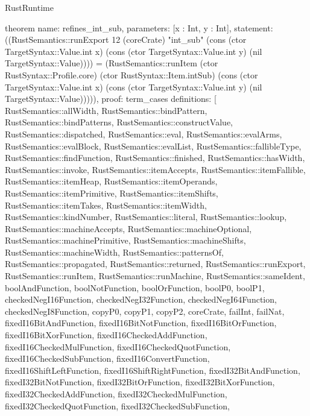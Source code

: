 \begin{lexlean}{RustRuntime}
\begin{semanticmodule}
theorem{
  name: refines_int_sub,
  parameters: [x : Int, y : Int],
  statement: ((RustSemantics::runExport 12 (coreCrate) "int_sub" (cons (ctor TargetSyntax::Value.int x) (cons (ctor TargetSyntax::Value.int y) (nil TargetSyntax::Value)))) = (RustSemantics::runItem (ctor RustSyntax::Profile.core) (ctor RustSyntax::Item.intSub) (cons (ctor TargetSyntax::Value.int x) (cons (ctor TargetSyntax::Value.int y) (nil TargetSyntax::Value))))),
  proof: term_cases{
    definitions: [
      RustSemantics::allWidth,
      RustSemantics::bindPattern,
      RustSemantics::bindPatterns,
      RustSemantics::constructValue,
      RustSemantics::dispatched,
      RustSemantics::eval,
      RustSemantics::evalArms,
      RustSemantics::evalBlock,
      RustSemantics::evalList,
      RustSemantics::fallibleType,
      RustSemantics::findFunction,
      RustSemantics::finished,
      RustSemantics::hasWidth,
      RustSemantics::invoke,
      RustSemantics::itemAccepts,
      RustSemantics::itemFallible,
      RustSemantics::itemHeap,
      RustSemantics::itemOperands,
      RustSemantics::itemPrimitive,
      RustSemantics::itemShifts,
      RustSemantics::itemTakes,
      RustSemantics::itemWidth,
      RustSemantics::kindNumber,
      RustSemantics::literal,
      RustSemantics::lookup,
      RustSemantics::machineAccepts,
      RustSemantics::machineOptional,
      RustSemantics::machinePrimitive,
      RustSemantics::machineShifts,
      RustSemantics::machineWidth,
      RustSemantics::patternsOf,
      RustSemantics::propagated,
      RustSemantics::returned,
      RustSemantics::runExport,
      RustSemantics::runItem,
      RustSemantics::runMachine,
      RustSemantics::sameIdent,
      boolAndFunction,
      boolNotFunction,
      boolOrFunction,
      boolP0,
      boolP1,
      checkedNegI16Function,
      checkedNegI32Function,
      checkedNegI64Function,
      checkedNegI8Function,
      copyP0,
      copyP1,
      copyP2,
      coreCrate,
      failInt,
      failNat,
      fixedI16BitAndFunction,
      fixedI16BitNotFunction,
      fixedI16BitOrFunction,
      fixedI16BitXorFunction,
      fixedI16CheckedAddFunction,
      fixedI16CheckedMulFunction,
      fixedI16CheckedQuotFunction,
      fixedI16CheckedSubFunction,
      fixedI16ConvertFunction,
      fixedI16ShiftLeftFunction,
      fixedI16ShiftRightFunction,
      fixedI32BitAndFunction,
      fixedI32BitNotFunction,
      fixedI32BitOrFunction,
      fixedI32BitXorFunction,
      fixedI32CheckedAddFunction,
      fixedI32CheckedMulFunction,
      fixedI32CheckedQuotFunction,
      fixedI32CheckedSubFunction,
}}
\end{semanticmodule}
\end{lexlean}
